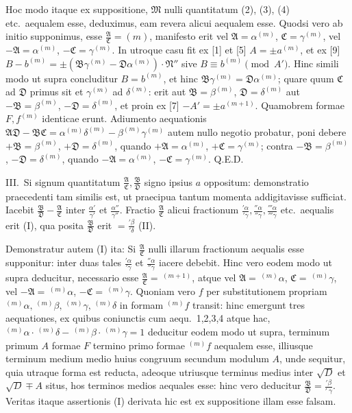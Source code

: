 \documentclass[12pt,a4paper]{article}
\theoremstyle{plain}
\theoremstyle{definition}
\theoremstyle{remark}
\newcommand{\qeode}{\textsc{Q.E.D.}}
\begin{document}
Hoc modo itaque ex suppositione, $\mathfrak{M}$ nulli quantitatum (2), (3), (4) etc.\ aequalem esse, deduximus, eam revera alicui aequalem esse. Quodsi vero ab initio supponimus, esse $\frac{\mathfrak{A}}{\mathfrak{C}}=(m)$, manifesto erit vel $\mathfrak{A}=\alpha^{(m)}$, $\mathfrak{C}=\gamma^{(m)}$, vel $-\mathfrak{A}=\alpha^{(m)}$, $-\mathfrak{C}=\gamma^{(m)}$. In utroque casu fit ex [1] et [5] $A=\pm a^{(m)}$, et ex [9] $B-b^{(m)}=\pm(\mathfrak{B}\gamma^{(m)}-\mathfrak{D}\alpha^{(m)})\cdot\mathfrak{N}''$ sive $B\equiv b^{(m)}\pmod{A'}$. Hinc simili modo ut supra concluditur $B=b^{(m)}$, et hinc $\mathfrak{B}\gamma^{(m)}=\mathfrak{D}\alpha^{(m)}$; quare quum $\mathfrak{C}$ ad $\mathfrak{D}$ primus sit et $\gamma^{(m)}$ ad $\delta^{(m)}$: erit aut $\mathfrak{B}=\beta^{(m)}$, $\mathfrak{D}=\delta^{(m)}$ aut $-\mathfrak{B}=\beta^{(m)}$, $-\mathfrak{D}=\delta^{(m)}$, et proin ex [7] $-A'=\pm a^{(m+1)}$. Quamobrem formae $F,f^{(m)}$ identicae erunt. Adiumento aequationis $\mathfrak{A}\mathfrak{D}-\mathfrak{B}\mathfrak{C}=\alpha^{(m)}\delta^{(m)}-\beta^{(m)}\gamma^{(m)}$ autem nullo negotio probatur, poni debere $+\mathfrak{B}=\beta^{(m)}$, $+\mathfrak{D}=\delta^{(m)}$, quando $+\mathfrak{A}=\alpha^{(m)}$, $+\mathfrak{C}=\gamma^{(m)}$; contra $-\mathfrak{B}=\beta^{(m)}$, $-\mathfrak{D}=\delta^{(m)}$, quando $-\mathfrak{A}=\alpha^{(m)}$, $-\mathfrak{C}=\gamma^{(m)}$. \qeode

III.\ Si signum quantitatum $\frac{\mathfrak{A}}{\mathfrak{C}},\frac{\mathfrak{B}}{\mathfrak{D}}$ signo ipsius $a$ oppositum: demonstratio praecedenti tam similis est, ut praecipua tantum momenta addigitavisse sufficiat. Iacebit $\frac{\mathfrak{B}}{\mathfrak{D}}-\frac{\mathfrak{A}}{\mathfrak{C}}$ inter $\frac{\alpha'}{\gamma'}$ et $\frac{\alpha''}{\gamma''}$. Fractio $\frac{\mathfrak{A}}{\mathfrak{C}}$ alicui fractionum $\frac{'\alpha}{'\gamma},\frac{''\alpha}{''\gamma},\frac{'''\alpha}{'''\gamma}$ etc.\ aequalis erit (I), qua posita $\frac{\mathfrak{B}}{\mathfrak{D}}$ erit $=\frac{'\beta}{'\delta}$ (II).

Demonstratur autem (I) ita: Si $\frac{\mathfrak{A}}{\mathfrak{C}}$ nulli illarum fractionum aequalis esse supponitur: inter duas tales $\frac{'\alpha}{'\gamma}$ et $\frac{''\alpha}{''\gamma}$ iacere debebit. Hinc vero eodem modo ut supra deducitur, necessario esse $\frac{\mathfrak{A}}{\mathfrak{C}}=\,^{(m+1)}$, atque vel $\mathfrak{A}=\,^{(m)}\alpha$, $\mathfrak{C}=\,^{(m)}\gamma$, vel $-\mathfrak{A}=\,^{(m)}\alpha$, $-\mathfrak{C}=\,^{(m)}\gamma$. Quoniam vero $f$ per substitutionem propriam $^{(m)}\alpha,\,^{(m)}\beta,\,^{(m)}\gamma,\,^{(m)}\delta$ in formam $^{(m)}f$ transit: hinc emergunt tres aequationes, ex quibus coniunctis cum aequ.\ 1,2,3,4 atque hac, $^{(m)}\alpha\cdot\,^{(m)}\delta-\,^{(m)}\beta\cdot\,^{(m)}\gamma=1$ deducitur eodem modo ut supra, terminum primum $A$ formae $F$ termino primo formae $^{(m)}f$ aequalem esse, illiusque terminum medium medio huius congruum secundum modulum $A$, unde sequitur, quia utraque forma est reducta, adeoque utriusque terminus medius inter $\sqrt{D}$ et $\sqrt{D}\mp A$ situs, hos terminos medios aequales esse: hinc vero deducitur $\frac{\mathfrak{B}}{\mathfrak{D}}=\frac{'\beta}{'~
\gamma}$. Veritas itaque assertionis (I) derivata hic est ex suppositione illam esse falsam.
\end{document}
